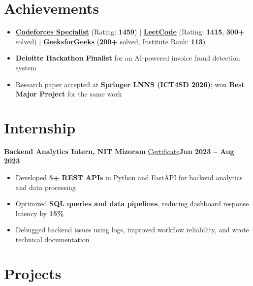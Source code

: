 \documentclass[a4paper,11pt]{article}
\begin{document}
\section*{Achievements}

\begin{itemize}
    \item \href{https://codeforces.com/profile/cookingDSA}{\textbf{Codeforces Specialist}} (Rating: \textbf{1459})
    \;|\;
    \href{https://leetcode.com/u/cookingDSA/}{\textbf{LeetCode}} (Rating: \textbf{1415}, \textbf{300+} solved)
    \;|\;
    \href{https://www.geeksforgeeks.org/profile/rpranatxwq}{\textbf{GeeksforGeeks}} (\textbf{200+} solved, Institute Rank: \textbf{113})
    \item \textbf{Deloitte Hackathon Finalist} for an AI-powered invoice fraud detection system
    \item Research paper accepted at \textbf{Springer LNNS (ICT4SD 2026)}; won \textbf{Best Major Project} for the same work
\end{itemize}

\section*{Internship}

\textbf{Backend Analytics Intern, NIT Mizoram}
\hfill
{\small \href{https://drive.google.com/file/d/1QYB7fUVvYapT_dSPwJn_11LaiQsxT2Ew/view?usp=drivesdk}{Certificate}}\hspace{0.6em}\textbf{Jun 2023 -- Aug 2023}

\begin{itemize}
    \item Developed \textbf{5+ REST APIs} in Python and FastAPI for backend analytics and data processing
    \item Optimized \textbf{SQL queries and data pipelines}, reducing dashboard response latency by \textbf{15\%}
    \item Debugged backend issues using logs, improved workflow reliability, and wrote technical documentation
\end{itemize}

\section*{Projects}
\end{document}
